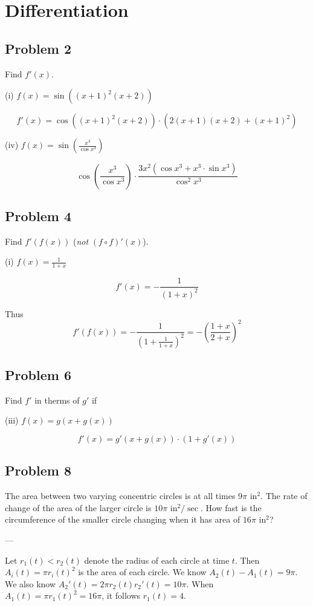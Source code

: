 
\section{Differentiation}

\subsection*{Problem 2}
Find $f'(x)$.

\vs

(i) $f(x)=\sin((x+1)^2(x+2))$

\[f'(x)=\cos((x+1)^2(x+2))\cdot(2(x+1)(x+2)+(x+1)^2)\]

\vs

(iv) $f(x)=\sin\left(\frac{x^3}{\cos x^3}\right)$

\[\cos\left(\frac{x^3}{\cos x^3}\right)\cdot \frac{3x^2(\cos x^3+x^3\cdot \sin
    x^3)}{\cos^2 x^3}\]


\subsection*{Problem 4}
Find $f'(f(x))$ (\textit{not} $(f\circ f)'(x)$).

\vs

(i) $f(x)=\frac{1}{1+x}$

\[f'(x)=-\frac{1}{(1+x)^2}\]

Thus
\[f'(f(x))=-\frac{1}{(1+\frac{1}{1+x})^2}=-\left(\frac{1+x}{2+x}\right)^2\]

\subsection*{Problem 6}
Find $f'$ in therms of $g'$ if

\vs

(iii) $f(x)=g(x+g(x))$

\[f'(x)=g'(x+g(x))\cdot (1+g'(x))\]

\subsection*{Problem 8}
The area between two varying concentric circles is at all times $9\pi$
in$^{2}$. The rate of change of the area of the larger circle is
$10\pi$ in$^2/\sec$. How fast is the circumference of the smaller circle
changing when it has area of $16\pi$ in$^2$?

\vs---\vs

Let $r_1(t)<r_2(t)$ denote the radius of each circle at time $t$. Then
$A_i(t)=\pi r_i(t)^2$ is the area of each circle. We know
$A_2(t)-A_1(t)=9\pi$. We also know $A_2'(t)=2\pi r_2(t)r_2'(t)=10\pi$. When
$A_1(t)=\pi r_1(t)^2=16\pi$, it follows $r_1(t)=4$.

